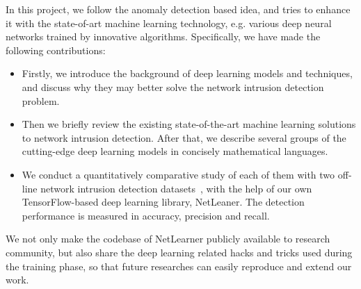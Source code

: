 In this project, we follow the anomaly detection based idea, and tries to enhance it with the
state-of-art machine learning technology, e.g. various deep neural networks trained by innovative algorithms.
Specifically, we have made the following contributions:
\begin{itemize}
    \item Firstly, we introduce the background of deep learning models and techniques,
        and discuss why they may better solve the network intrusion detection problem.
    \item Then we briefly review the existing state-of-the-art machine learning solutions to network intrusion detection.
        After that, we describe several groups of the cutting-edge deep learning models
        in concisely mathematical languages.
    \item We conduct a quantitatively comparative study of each of them with
        two off-line network intrusion detection datasets~\cite{NSL-KDD, UNSW},
        with the help of our own TensorFlow-based deep learning library, NetLeaner.
        The detection performance is measured in accuracy, precision and recall.
\end{itemize}
We not only make the codebase of NetLearner publicly available to research community,
but also share the deep learning related hacks and tricks used during the training phase,
so that future researches can easily reproduce and extend our work.
